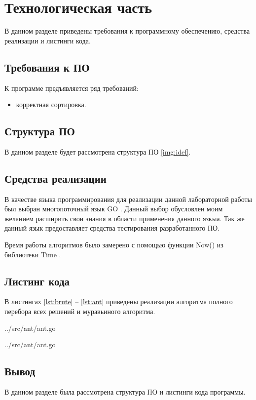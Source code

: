 \chapter{Технологическая часть}

В данном разделе приведены требования к программному обеспечению, средства реализации и листинги кода.

\section{Требования к ПО}

К программе предъявляется ряд требований:
\begin{itemize}
	\item корректная сортировка.
\end{itemize}

\section{Структура ПО}

В данном разделе будет рассмотрена структура ПО \ref{img:idef}.


\section{Средства реализации}

В качестве языка программирования для реализации данной лабораторной работы был выбран многопоточный язык GO \cite{golang}. Данный выбор обусловлен моим желанием расширить свои знания в области применения данного язкыа. Так же данный язык предоставляет средства тестирования разработанного ПО.

Время работы алгоритмов было замерено с помощью функции {\ttfamily Now()} из библиотеки {\ttfamily Time} \cite{lib:time}.

\clearpage

\section{Листинг кода}

В листингах \ref{lst:brute} -- \ref{lst:ant} приведены реализации алгоритма полного перебора всех решений и муравьиного алгоритма.

\begin{lstinputlisting}[
	caption={Алгоритм перебора всех возможных вариантов},
	label={lst:brute},
	style={go},
	linerange={194-245},
	]{../src/ant/ant.go}
\end{lstinputlisting}

\begin{lstinputlisting}[
	caption={Реализация реализация линейного конвейера},
	label={lst:ant},
	style={go},
	linerange={85-192},
	]{../src/ant/ant.go}
\end{lstinputlisting}


\section*{Вывод}

В данном разделе была рассмотрена структура ПО и листинги кода программы.

